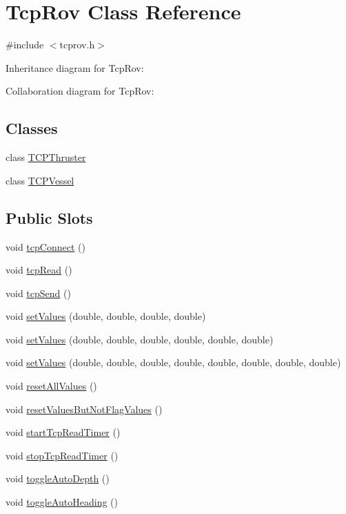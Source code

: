 \hypertarget{class_tcp_rov}{}\section{Tcp\+Rov Class Reference}
\label{class_tcp_rov}


{\ttfamily \#include $<$tcprov.\+h$>$}



Inheritance diagram for Tcp\+Rov\+:


Collaboration diagram for Tcp\+Rov\+:
\subsection*{Classes}
\begin{DoxyCompactItemize}
\item 
class \mbox{\hyperlink{class_tcp_rov_1_1_t_c_p_thruster}{T\+C\+P\+Thruster}}
\item 
class \mbox{\hyperlink{class_tcp_rov_1_1_t_c_p_vessel}{T\+C\+P\+Vessel}}
\end{DoxyCompactItemize}
\subsection*{Public Slots}
\begin{DoxyCompactItemize}
\item 
void \mbox{\hyperlink{class_tcp_rov_a0eee6d4cc81a4a1ffefc7d5860a2161e}{tcp\+Connect}} ()
\item 
void \mbox{\hyperlink{class_tcp_rov_a6d49254af0b9a4a53675dbae32c5a937}{tcp\+Read}} ()
\item 
void \mbox{\hyperlink{class_tcp_rov_ab04514769f70093b687558d09716ae5c}{tcp\+Send}} ()
\item 
void \mbox{\hyperlink{class_tcp_rov_a9d719ce6c283d311ac81e89ff56c973a}{set\+Values}} (double, double, double, double)
\item 
void \mbox{\hyperlink{class_tcp_rov_a01029567d86810a512a6dd8a0349bfec}{set\+Values}} (double, double, double, double, double, double)
\item 
void \mbox{\hyperlink{class_tcp_rov_a02c824d8ad2ce77e8d1a4ea7bc1fd9fe}{set\+Values}} (double, double, double, double, double, double, double, double)
\item 
void \mbox{\hyperlink{class_tcp_rov_aa7314c89fd4e5dcd04e42cf965e8e890}{reset\+All\+Values}} ()
\item 
void \mbox{\hyperlink{class_tcp_rov_a8d1bbd6025b53b04f03622ee996eb292}{reset\+Values\+But\+Not\+Flag\+Values}} ()
\item 
void \mbox{\hyperlink{class_tcp_rov_aa5e739ff2a64a009bbd518eae6f226b0}{start\+Tcp\+Read\+Timer}} ()
\item 
void \mbox{\hyperlink{class_tcp_rov_a0663b83a515ba834e58913407aeb2246}{stop\+Tcp\+Read\+Timer}} ()
\item 
void \mbox{\hyperlink{class_tcp_rov_acaef32df08c8e1c6ea6760b5e9dcd51b}{toggle\+Auto\+Depth}} ()
\item 
void \mbox{\hyperlink{class_tcp_rov_a5d93e60de71cced318526e3a26274c21}{toggle\+Auto\+Heading}} ()
\end{DoxyCompactItemize}
